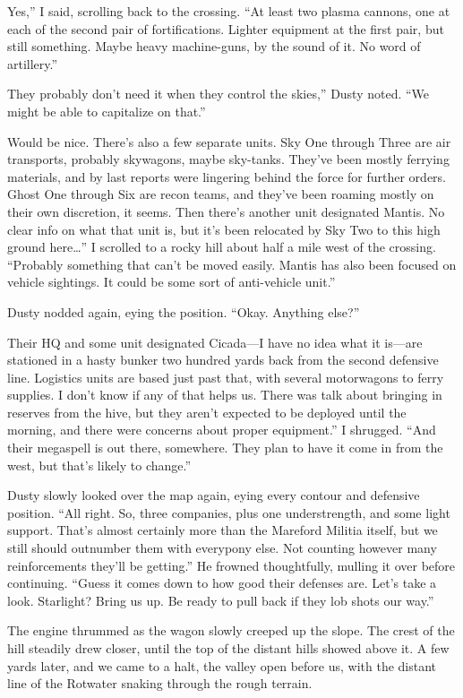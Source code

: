\leavevmode{}Yes,” I said, scrolling back to the crossing. “At least two plasma cannons, one at each of the second pair of fortifications. Lighter equipment at the first pair, but still something. Maybe heavy machine-guns, by the sound of it. No word of artillery.”

\leavevmode{}They probably don’t need it when they control the skies,” Dusty noted. “We might be able to capitalize on that.”

\leavevmode{}Would be nice. There’s also a few separate units. Sky One through Three are air transports, probably skywagons, maybe sky-tanks. They’ve been mostly ferrying materials, and by last reports were lingering behind the force for further orders. Ghost One through Six are recon teams, and they’ve been roaming mostly on their own discretion, it seems. Then there’s another unit designated Mantis. No clear info on what that unit is, but it’s been relocated by Sky Two to this high ground here…” I scrolled to a rocky hill about half a mile west of the crossing. “Probably something that can’t be moved easily. Mantis has also been focused on vehicle sightings. It could be some sort of anti-vehicle unit.”

Dusty nodded again, eying the position. “Okay. Anything else?”

\leavevmode{}Their HQ and some unit designated Cicada—I have no idea what it is—are stationed in a hasty bunker two hundred yards back from the second defensive line. Logistics units are based just past that, with several motorwagons to ferry supplies. I don’t know if any of that helps us. There was talk about bringing in reserves from the hive, but they aren’t expected to be deployed until the morning, and there were concerns about proper equipment.” I shrugged. “And their megaspell is out there, somewhere. They plan to have it come in from the west, but that’s likely to change.”

Dusty slowly looked over the map again, eying every contour and defensive position. “All right. So, three companies, plus one understrength, and some light support. That’s almost certainly more than the Mareford Militia itself, but we still should outnumber them with everypony else. Not counting however many reinforcements they’ll be getting.” He frowned thoughtfully, mulling it over before continuing. “Guess it comes down to how good their defenses are. Let’s take a look. Starlight? Bring us up. Be ready to pull back if they lob shots our way.”

The engine thrummed as the wagon slowly creeped up the slope. The crest of the hill steadily drew closer, until the top of the distant hills showed above it. A few yards later, and we came to a halt, the valley open before us, with the distant line of the Rotwater snaking through the rough terrain.

